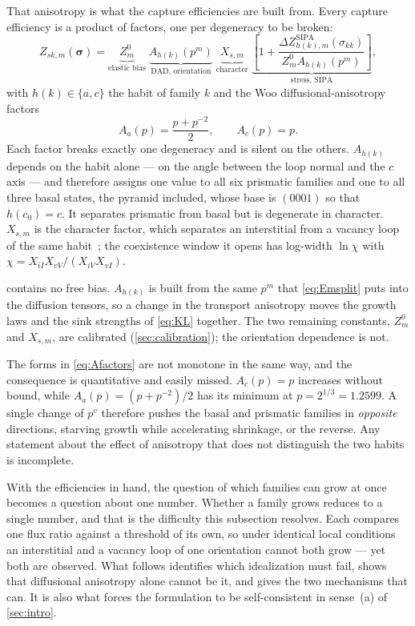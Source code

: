 That anisotropy is what the capture efficiencies are built from.
Every capture efficiency is a product of factors, one per degeneracy to be
broken:
\begin{equation}
  Z_{sk,m}(\bm\sigma)
  = \underbrace{Z^{0}_m}_{\text{elastic bias}}\;
    \underbrace{A_{h(k)}(p^{m})}_{\text{DAD, orientation}}\;
    \underbrace{X_{s,m}}_{\text{character}}\;
    \underbrace{\left[1+\frac{\Delta Z^{\mathrm{SIPA}}_{h(k),m}(\sigma_{kk})}
                            {Z^{0}_mA_{h(k)}(p^{m})}\right]}_{\text{stress, SIPA}},
  \label{eq:Zsk}
\end{equation}
with $h(k)\in\{a,c\}$ the habit of family $k$ and the Woo diffusional-anisotropy
factors~\citep{woo1988theory,woo1981sink,po2026tensorialdad}
\begin{equation}
  A_a(p)=\frac{p+p^{-2}}{2},
  \qquad
  A_c(p)=p .
  \label{eq:Afactors}
\end{equation}
Each factor breaks exactly one degeneracy and is silent on the others.
$A_{h(k)}$ depends on the habit alone --- on the angle between the loop normal
and the $c$ axis --- and therefore assigns one value to all six prismatic
families and one to all three basal states, the pyramid included, whose base is
$(0001)$ so that $h(c_0)=c$. It separates prismatic from basal but is degenerate
in character. $X_{s,m}$ is the character factor, which separates an interstitial
from a vacancy loop of the same habit~\citep{marchrico2023,marchrico2025}; the
coexistence window it opens has log-width $\ln\chi$ with
$\chi=X_{iI}X_{vV}/(X_{iV}X_{vI})$.

 contains no free bias. $A_{h(k)}$ is built from the same
$p^{m}$ that \cref{eq:Emsplit} puts into the diffusion tensors, so a change in
the transport anisotropy moves the growth laws and the sink strengths of
\cref{eq:KL} together. The two remaining constants, $Z^{0}_m$ and $X_{s,m}$, are
calibrated (\cref{sec:calibration}); the orientation dependence is not.

The forms in \cref{eq:Afactors} are not monotone in the same way, and the
consequence is quantitative and easily missed. $A_c(p)=p$ increases without
bound, while $A_a(p)=(p+p^{-2})/2$ has its minimum at $p=2^{1/3}=1.2599$. A
single change of $p^{v}$ therefore pushes the basal and prismatic families in
\emph{opposite} directions, starving \cloop{} growth while accelerating \aloop{}
shrinkage, or the reverse. Any statement about the effect of anisotropy that
does not distinguish the two habits is incomplete.

With the efficiencies in hand, the question of which families can grow at
once becomes a question about one number.
Whether a family grows reduces to a single number, and that is the difficulty
this subsection resolves. Each compares one flux ratio against a threshold of
its own, so under identical local conditions an interstitial and a vacancy loop
of one orientation cannot both grow --- yet both are observed. What follows
identifies which idealization must fail, shows that diffusional anisotropy alone
cannot be it, and gives the two mechanisms that can. It is also what forces the
formulation to be self-consistent in sense~(a) of \cref{sec:intro}.


